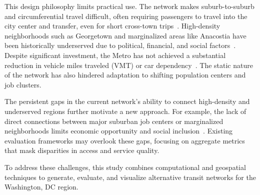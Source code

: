 \documentclass[sigconf,nonacm]{acmart}
\begin{document}
This design philosophy limits practical use. The network makes suburb-to-suburb and circumferential travel difficult, often requiring passengers to travel into the city center and transfer, even for short cross-town trips~\cite{lit:wmata_stats}. High-density neighborhoods such as Georgetown and marginalized areas like Anacostia have been historically underserved due to political, financial, and social factors~\cite{lit:equity}. Despite significant investment, the Metro has not achieved a substantial reduction in vehicle miles traveled (VMT) or car dependency~\cite{lit:env}. The static nature of the network has also hindered adaptation to shifting population centers and job clusters.

The persistent gaps in the current network's ability to connect high-density and underserved regions further motivate a new approach. For example, the lack of direct connections between major suburban job centers or marginalized neighborhoods limits economic opportunity and social inclusion~\cite{lit:equity}. Existing evaluation frameworks may overlook these gaps, focusing on aggregate metrics that mask disparities in access and service quality.

To address these challenges, this study combines computational and geospatial techniques to generate, evaluate, and visualize alternative transit networks for the Washington, DC region.




\begin{table}[h]
\caption{Counties and County-Equivalents in the Study Area}
\label{tab:counties}
\end{table}
\end{document}
